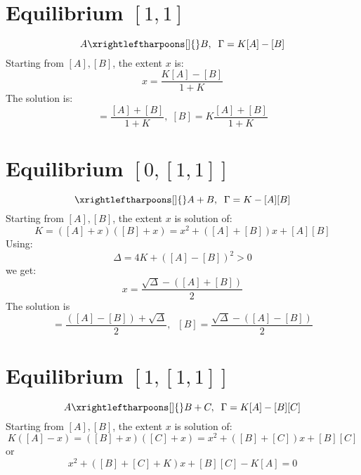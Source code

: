 \documentclass[aps,12pt]{revtex4}
\begin{document}
\section{Equilibrium $[1,1]$}
\begin{equation}
	A \xrightleftharpoons[]{} B, \;\; \Gamma = K[A]-[B]
\end{equation}
Starting from $[A],[B]$, the extent $x$ is:
\begin{equation}
	x = \dfrac{K[A]-[B]}{1+K}
\end{equation}
The solution is:
\begin{equation}
	[A] = \dfrac{[A]+[B]}{1+K}, \; [B] = K \dfrac{ [A]+[B] }{1+K}
\end{equation}


\section{Equilibrium $[0,[1,1]]$}
\begin{equation}
	\xrightleftharpoons[]{} A+B, \;\; \Gamma = K - [A][B]
\end{equation}
Starting from $[A],[B]$, the extent $x$ is solution of:
\begin{equation}
	K = ([A]+x)([B]+x) = x^2 + ([A]+[B])x + [A][B]
\end{equation}
Using:
\begin{equation}
	\Delta = 4K + ([A]-[B])^2 > 0
\end{equation}
we get:
\begin{equation}
	x = \dfrac{\sqrt{\Delta}-([A]+[B])}{2}
\end{equation}
The solution is
\begin{equation}
	[A] =  \dfrac{([A]-[B])+\sqrt{\Delta}}{2},\;\;[B] = \dfrac{\sqrt{\Delta}-([A]-[B])}{2}
\end{equation}

\section{Equilibrium $[1,[1,1]]$}
\begin{equation}
	A\xrightleftharpoons[]{} B+C, \;\; \Gamma = K[A] - [B][C]
\end{equation}
Starting from $[A],[B]$, the extent $x$ is solution of:
\begin{equation}
	K([A]-x) = ([B]+x)([C]+x) = x^2 + ([B]+[C])x + [B][C]
\end{equation}
or
\begin{equation}
	x^2 + ([B]+[C]+K) x + [B][C]-K[A] = 0	
\end{equation}
\end{document}
